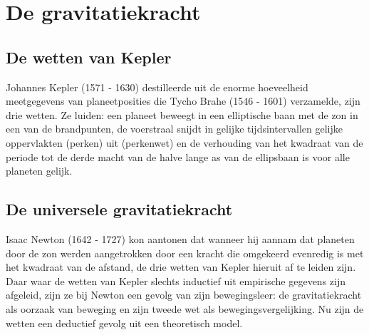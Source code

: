 
\chapter{De gravitatiekracht}


%
%
%
%




\section{De wetten van Kepler}

Johannes Kepler (1571 - 1630) destilleerde uit de enorme hoeveelheid meetgegevens van planeetposities die Tycho Brahe (1546 - 1601) verzamelde, zijn drie wetten. Ze luiden: een planeet beweegt in een elliptische baan met de zon in een van de brandpunten, de voerstraal snijdt in gelijke tijdsintervallen gelijke oppervlakten (perken) uit (perkenwet) en de verhouding van het kwadraat van de periode tot de derde macht van de halve lange as van de ellipsbaan is voor alle planeten gelijk.

\section{De universele gravitatiekracht}



Isaac Newton (1642 - 1727) kon aantonen dat wanneer hij aannam dat planeten door de zon werden aangetrokken door een kracht die omgekeerd evenredig is met het kwadraat van de afstand, de drie wetten van Kepler hieruit af te leiden zijn. Daar waar de wetten van Kepler slechts inductief uit empirische gegevens zijn afgeleid, zijn ze bij Newton een gevolg van zijn bewegingsleer: de gravitatiekracht als oorzaak van beweging en zijn tweede wet als bewegingsvergelijking. Nu zijn de wetten een deductief gevolg uit een theoretisch model.

